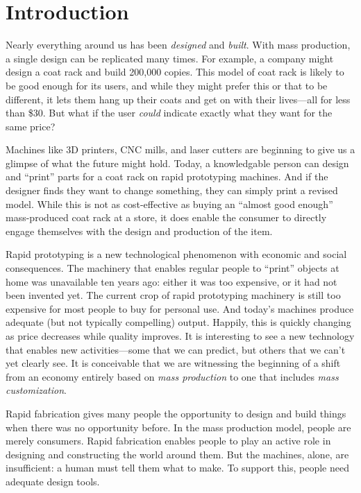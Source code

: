 \chapter{Introduction}

Nearly everything around us has been \textit{designed} and
\textit{built}. With mass production, a single design can be
replicated many times. For example, a company might design a coat rack
and build 200,000 copies. This model of coat rack is likely to be good
enough for its users, and while they might prefer this or that to be
different, it lets them hang up their coats and get on with their
lives---all for less than \$30. But what if the user \textit{could}
indicate exactly what they want for the same price?

Machines like 3D printers, CNC mills, and laser cutters are beginning
to give us a glimpse of what the future might hold. Today, a
knowledgable person can design and ``print'' parts for a coat rack on
rapid prototyping machines. And if the designer finds they want to
change something, they can simply print a revised model. While this is
not as cost-effective as buying an ``almost good enough''
mass-produced coat rack at a store, it does enable the consumer to
directly engage themselves with the design and production of the item.

Rapid prototyping is a new technological phenomenon with economic and
social consequences. The machinery that enables regular people to
``print'' objects at home was unavailable ten years ago: either it was
too expensive, or it had not been invented yet. The current crop of
rapid prototyping machinery is still too expensive for most people to
buy for personal use. And today's machines produce adequate (but not
typically compelling) output. Happily, this is quickly changing as
price decreases while quality improves. It is interesting to see a new
technology that enables new activities---some that we can predict, but
others that we can't yet clearly see. It is conceivable that we are
witnessing the beginning of a shift from an economy entirely based on
\textit{mass production} to one that includes \textit{mass
  customization}.

Rapid fabrication gives many people the opportunity to design and
build things when there was no opportunity before. In the mass
production model, people are merely consumers. Rapid fabrication
enables people to play an active role in designing and constructing
the world around them. But the machines, alone, are insufficient: a
human must tell them what to make. To support this, people need
adequate design tools.

